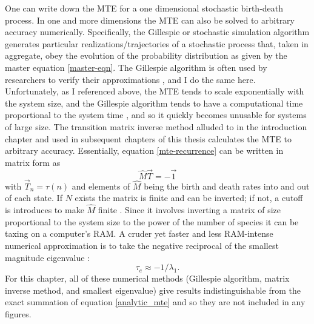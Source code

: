 One can write down the MTE for a one dimensional stochastic birth-death process. 
In one and more dimensions the MTE can also be solved to arbitrary accuracy numerically. 
Specifically, the Gillespie or stochastic simulation algorithm \cite{Gillespie1977,Cao2006} generates particular realizations/trajectories of a stochastic process that, taken in aggregate, obey the evolution of the probability distribution as given by the master equation \ref{master-eqn}. %
The Gillespie algorithm is often used by researchers to verify their approximations \cite{Reichenbach2006,Black2012,Dobrinevski2012,Chotibut2015,Constable2015,Gooding-townsend2015,Young2018}, and I do the same here. %
Unfortunately, as I referenced above, the MTE tends to scale exponentially with the system size, and the Gillespie algorithm tends to have a computational time proportional to the system time \cite{Gillespie1977}, and so it quickly becomes unusable for systems of large size. %
The transition matrix inverse method alluded to in the introduction chapter and used in subsequent chapters of this thesis calculates the MTE to arbitrary accuracy. 
Essentially, equation \ref{mte-recurrence} can be written in matrix form as \cite{Nisbet1982,Iyer-Biswas2015}
\begin{equation}
\hat{M}\vec{T} = -\vec{1} \label{matrix-method}
\end{equation}
with $\vec{T}_n = \tau(n)$ and elements of $\hat{M}$ being the birth and death rates into and out of each state. 
If $N$ exists the matrix is finite and can be inverted; if not, a cutoff is introduces to make $\hat{M}$ finite \cite{Munsky2006,Parsons2007,Parsons2010}. 
Since it involves inverting a matrix of size proportional to the system size to the power of the number of species it can be taxing on a computer's RAM. 
A cruder yet faster and less RAM-intense numerical approximation is to take the negative reciprocal of the smallest magnitude eigenvalue \cite{Hanggi1990}:
\begin{equation}
 \tau_e \approx -1/\lambda_1. 
\end{equation}
For this chapter, all of these numerical methods (Gillespie algorithm, matrix inverse method, and smallest eigenvalue) give results indistinguishable from the exact summation of equation \ref{analytic_mte} and so they are not included in any figures. 

